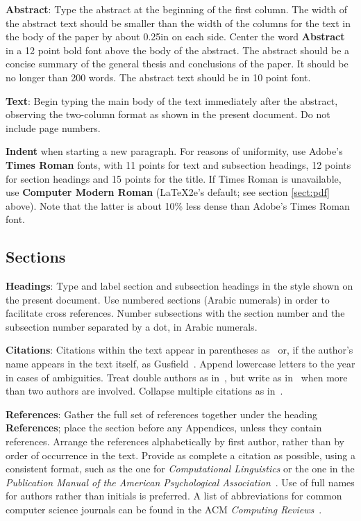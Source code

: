 \documentclass[11pt,letterpaper]{article}
\begin{document}
{\bf Abstract}: Type the abstract at the beginning of the first
column.  The width of the abstract text should be smaller than the
width of the columns for the text in the body of the paper by about
0.25in on each side.  Center the word {\bf Abstract} in a 12 point
bold font above the body of the abstract. The abstract should be a
concise summary of the general thesis and conclusions of the paper.
It should be no longer than 200 words.  The abstract text should be in 10 point font.

{\bf Text}: Begin typing the main body of the text immediately after
the abstract, observing the two-column format as shown in 
the present document.  Do not include page numbers.

{\bf Indent} when starting a new paragraph. For reasons of uniformity,
use Adobe's {\bf Times Roman} fonts, with 11 points for text and 
subsection headings, 12 points for section headings and 15 points for
the title.  If Times Roman is unavailable, use {\bf Computer Modern
  Roman} (\LaTeX2e{}'s default; see section \ref{sect:pdf} above).
Note that the latter is about 10\% less dense than Adobe's Times Roman
font.

\subsection{Sections}

{\bf Headings}: Type and label section and subsection headings in the
style shown on the present document.  Use numbered sections (Arabic
numerals) in order to facilitate cross references. Number subsections
with the section number and the subsection number separated by a dot,
in Arabic numerals. 

{\bf Citations}: Citations within the text appear
in parentheses as~\cite{Gusfield:97} or, if the author's name appears in
the text itself, as Gusfield~. 
Append lowercase letters to the year in cases of ambiguities.  
Treat double authors as in~\cite{Aho:72}, but write as 
in~\cite{Chandra:81} when more than two authors are involved. 
Collapse multiple citations as in~\cite{Gusfield:97,Aho:72}.

\textbf{References}: Gather the full set of references together under
the heading {\bf References}; place the section before any Appendices,
unless they contain references. Arrange the references alphabetically
by first author, rather than by order of occurrence in the text.
Provide as complete a citation as possible, using a consistent format,
such as the one for {\em Computational Linguistics\/} or the one in the 
{\em Publication Manual of the American 
Psychological Association\/}~\cite{APA:83}.  Use of full names for
authors rather than initials is preferred.  A list of abbreviations
for common computer science journals can be found in the ACM 
{\em Computing Reviews\/}~\cite{ACM:83}.
\end{document}
